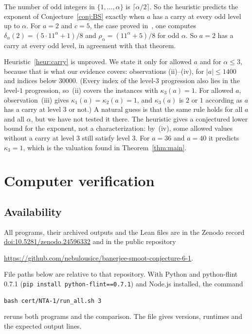 \documentclass[11pt]{amsart}
\theoremstyle{definition}
\theoremstyle{remark}
\begin{document}
The number of odd integers in \(\{1,\dots,\alpha\}\) is \(\lceil\alpha/2\rceil\). So the heuristic predicts the exponent of Conjecture~\ref{conj:BS} exactly when \(a\) has a carry at every odd level up to \(\alpha\). For \(a=2\) and \(c=5\), the case proved in~\cite[Thm.~1.1]{BS}, one computes \(\delta_\alpha(2)=(5\cdot11^\alpha+1)/8\) and \(\rho_\alpha=(11^\alpha+5)/8\) for odd \(\alpha\). So \(a=2\) has a carry at every odd level, in agreement with that theorem.

Heuristic~\ref{heur:carry} is unproved. We state it only for allowed \(a\) and for \(\alpha\le3\), because that is what our evidence covers: observations (ii)--(iv), for \(|a|\le1400\) and indices below \(30000\). (Every index of the level-\(3\) progression also lies in the level-\(1\) progression, so~(ii) covers the instances with \(\kappa_3(a)=1\). For allowed \(a\), observation~(iii) gives \(\kappa_1(a)=\kappa_2(a)=1\), and \(\kappa_3(a)\) is \(2\) or \(1\) according as \(a\) has a carry at level \(3\) or not.) A natural guess is that the same rule holds for all \(a\) and all \(\alpha\), but we have not tested it there. The heuristic gives a conjectured lower bound for the exponent, not a characterization: by~(iv), some allowed values without a carry at level \(3\) still satisfy level \(3\). For \(a=36\) and \(a=40\) it predicts \(\kappa_3=1\), which is the valuation found in Theorem~\ref{thm:main}.

\section{Computer verification}\label{sec:computer}

\subsection*{Availability}
All programs, their archived outputs and the Lean files are in the Zenodo record \href{https://doi.org/10.5281/zenodo.24596332}{doi:10.5281/zenodo.24596332} and in the public repository
\begin{center}
\url{https://github.com/nebulousice/banerjee-smoot-conjecture-6-1}.
\end{center}
File paths below are relative to that repository. With Python and python-flint 0.7.1 (\texttt{pip install python-flint==0.7.1}) and Node.js installed, the command
\begin{center}
\texttt{bash cert/NTA-1/run\_all.sh 3}
\end{center}
reruns both programs and the comparison. The file  gives versions, runtimes and the expected output lines.
\end{document}
